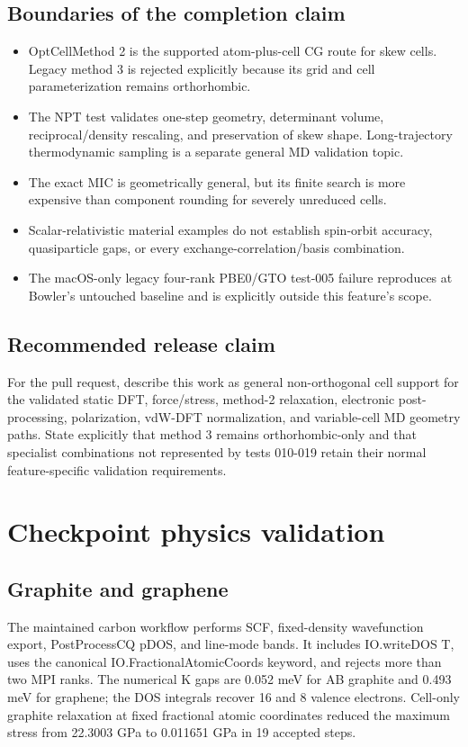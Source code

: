 \documentclass[10pt,a4paper]{report}
\begin{document}
\section{Boundaries of the completion claim}
\begin{itemize}
\item OptCellMethod 2 is the supported atom-plus-cell CG route for skew cells. Legacy method 3 is rejected explicitly because its grid and cell parameterization remains orthorhombic.
\item The NPT test validates one-step geometry, determinant volume, reciprocal/density rescaling, and preservation of skew shape. Long-trajectory thermodynamic sampling is a separate general MD validation topic.
\item The exact MIC is geometrically general, but its finite search is more expensive than component rounding for severely unreduced cells.
\item Scalar-relativistic material examples do not establish spin-orbit accuracy, quasiparticle gaps, or every exchange-correlation/basis combination.
\item The macOS-only legacy four-rank PBE0/GTO test-005 failure reproduces at Bowler's untouched baseline and is explicitly outside this feature's scope.
\end{itemize}
\section{Recommended release claim}
For the pull request, describe this work as general non-orthogonal cell support for the validated static DFT, force/stress, method-2 relaxation, electronic post-processing, polarization, vdW-DFT normalization, and variable-cell MD geometry paths. State explicitly that method 3 remains orthorhombic-only and that specialist combinations not represented by tests 010-019 retain their normal feature-specific validation requirements.

\chapter{Checkpoint physics validation}
\section{Graphite and graphene}
The maintained carbon workflow performs SCF, fixed-density wavefunction export, PostProcessCQ pDOS, and line-mode bands. It includes IO.writeDOS T, uses the canonical IO.FractionalAtomicCoords keyword, and rejects more than two MPI ranks. The numerical K gaps are 0.052 meV for AB graphite and 0.493 meV for graphene; the DOS integrals recover 16 and 8 valence electrons. Cell-only graphite relaxation at fixed fractional atomic coordinates reduced the maximum stress from 22.3003 GPa to 0.011651 GPa in 19 accepted steps.
\end{document}
